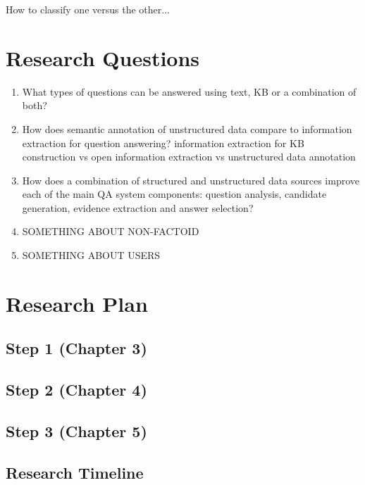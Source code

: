 How to classify one versus the other...

\section{Research Questions}

\begin{enumerate}
\item What types of questions can be answered using text, KB or a combination of both?
\item How does semantic annotation of unstructured data compare to information extraction for question answering?
information extraction for KB construction vs open information extraction vs unstructured data annotation
\item How does a combination of structured and unstructured data sources improve each of the main QA system components: question analysis, candidate generation, evidence extraction and answer selection?
\item SOMETHING ABOUT NON-FACTOID
\item SOMETHING ABOUT USERS
\end{enumerate}


\section{Research Plan}

\subsection{Step 1 (Chapter 3)}
\label{sec:plan1}

\subsection{Step 2 (Chapter 4)}
\label{sec:plan2}

\subsection{Step 3 (Chapter 5)}
\label{sec:plan3}

\subsection{Research Timeline}



